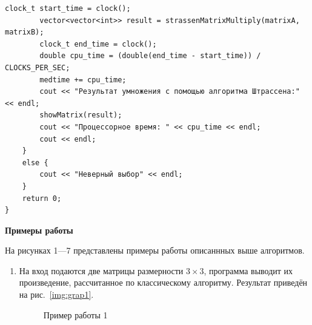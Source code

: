 \documentclass[12pt, a4paper]{article}
\begin{document}
\begin{lstlisting}[caption={Исходный код}, label={lst:label1}]
        clock_t start_time = clock();
        vector<vector<int>> result = strassenMatrixMultiply(matrixA, matrixB);
        clock_t end_time = clock();
        double cpu_time = (double(end_time - start_time)) / CLOCKS_PER_SEC;
        medtime += cpu_time;
        cout << "Результат умножения с помощью алгоритма Штрассена:" << endl;
        showMatrix(result);
        cout << "Процессорное время: " << cpu_time << endl;
        cout << endl;
    }
    else {
        cout << "Неверный выбор" << endl;
    }
    return 0;
}
\end{lstlisting}
\newpage
\begin{center}
	\textbf{Примеры работы}
\end{center}
На рисунках 1---7 представлены примеры работы описаннных выше алгоритмов.
\begin{enumerate}
	\item На вход подаются две матрицы размерности $3 \times 3$, 
	программа выводит их произведение, рассчитанное по классическому алгоритму.
	Результат приведён на рис.~\ref{img:grap1}.
	\begin{figure}[h]
  		\caption{Пример работы 1}

\end{figure}
\end{enumerate}
\end{document}
